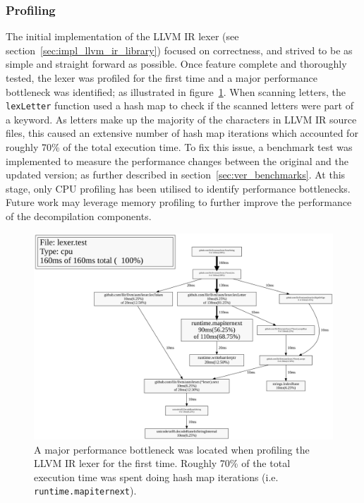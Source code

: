 
\subsubsection{Profiling}
\label{sec:ver_profiling}

The initial implementation of the LLVM IR lexer (see section~\ref{sec:impl_llvm_ir_library}) focused on correctness, and strived to be as simple and straight forward as possible. Once feature complete and thoroughly tested, the lexer was profiled for the first time and a major performance bottleneck was identified; as illustrated in figure~\ref{fig:lexer_pprof}. When scanning letters, the \texttt{lexLetter} function used a hash map to check if the scanned letters were part of a keyword. As letters make up the majority of the characters in LLVM IR source files, this caused an extensive number of hash map iterations which accounted for roughly 70\% of the total execution time. To fix this issue, a benchmark test was implemented to measure the performance changes between the original and the updated version; as further described in section~\ref{sec:ver_benchmarks}. At this stage, only CPU profiling has been utilised to identify performance bottlenecks. Future work may leverage memory profiling to further improve the performance of the decompilation components.

\begin{figure}[htbp]
	\begin{center}
		\includegraphics[width=\textwidth]{inc/8_ver/lexer_pprof.png}
		\caption{A major performance bottleneck was located when profiling the LLVM IR lexer for the first time. Roughly 70\% of the total execution time was spent doing hash map iterations (i.e. \texttt{runtime.mapiternext}).}
		\label{fig:lexer_pprof}
	\end{center}
\end{figure}
